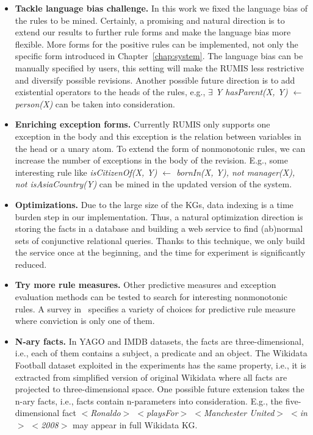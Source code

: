 \begin{itemize}
\item \textbf{Tackle language bias challenge.} In this work we fixed the language bias of the rules to be mined. Certainly, a promising and natural direction is to extend our results to further rule forms and make the language bias more flexible. More forms for the positive rules can be implemented, not only the specific form introduced in Chapter~\ref{chap:system}. The language bias can be manually specified by users, this setting will make the RUMIS less restrictive and diversify possible revisions. Another possible future direction is to add existential operators to the heads of the rules, e.g., \textit{$\exists$ Y hasParent(X, Y) $\leftarrow$ person(X)} can be taken into consideration.
\item \textbf{Enriching exception forms.} Currently RUMIS only supports one exception in the body and this exception is the relation between variables in the head or a unary atom. To extend the form of nonmonotonic rules, we can increase the number of exceptions in the body of the revision. E.g., some interesting rule like \textit{isCitizenOf(X, Y) $\leftarrow$ bornIn(X, Y), not manager(X), not isAsiaCountry(Y)} can be mined in the updated version of the system.
\item \textbf{Optimizations.} Due to the large size of the KGs, data indexing is a time burden step in our implementation. Thus, a natural optimization direction is storing the facts in a database and building a web service to find (ab)normal sets of conjunctive relational queries. Thanks to this technique, we only build the service once at the beginning, and the time for experiment is significantly reduced.
\item \textbf{Try more rule measures.} Other predictive measures and exception evaluation methods can be tested to search for interesting nonmonotonic rules. A survey in~\cite{ref46} specifies a variety of choices for predictive rule measure where conviction is only one of them.
\item \textbf{N-ary facts.} In YAGO and IMDB datasets, the facts are three-dimensional, i.e., each of them contains a subject, a predicate and an object. The Wikidata Football dataset exploited in the experiments has the same property, i.e., it is extracted from simplified version of original Wikidata where all facts are projected to three-dimensional space. One possible future extension takes the n-ary facts, i.e., facts contain n-parameters into consideration. E.g., the five-dimensional fact \textit{$<$Ronaldo$>$ $<$playsFor$>$ $<$Manchester United$>$ $<$in$>$ $<$2008$>$} may appear in full Wikidata KG.

\end{itemize}
